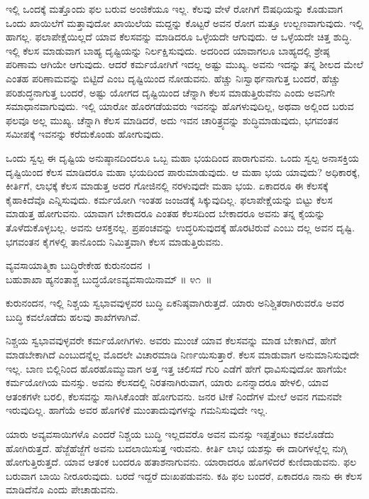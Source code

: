 ಇಲ್ಲಿ ಒಂದಕ್ಕೆ ಮತ್ತೊಂದು ಫಲ ಬರುವ ಅಂಜಿಕೆಯೂ ಇಲ್ಲ. ಕೆಲವು ವೇಳೆ ರೋಗಿಗೆ ಔಷಧಿಯನ್ನು ಕೊಡುವಾಗ ಒಂದು ಖಾಯಿಲೆಗೆ ಮತ್ತಾವುದೋ ಖಾಯಿಲೆಯ ಮದ್ದನ್ನು ಕೊಟ್ಟರೆ ಅವನ ರೋಗ ಮತ್ತೂ ಉಲ್ಬಣವಾಗುವುದು. ಇಲ್ಲಿ ಹಾಗಲ್ಲ. ಫಲಾಪೇಕ್ಷೆಯಿಲ್ಲದೆ ಯಾವ ಕೆಲಸವನ್ನು ಮಾಡಿದರೂ ಒಳ್ಳೆಯದೇ ಆಗುವುದು. ಆ ಒಳ್ಳೆಯದೇ ಚಿತ್ತ ಶುದ್ಧಿ. ಇಲ್ಲಿ ಕೆಲಸ ಮಾಡುವಾಗ ಬಾಹ್ಯ ದೃಷ್ಟಿಯನ್ನು ನಿರ್ಲಕ್ಷಿಸುವುದು. ಅದರಿಂದ ಯಾವಾಗಲೂ ಬಾಹ್ಯದಲ್ಲಿ ಶ್ರೇಷ್ಠ ಪರಿಣಾಮ ಆಗಿಯೇ ಆಗುವುದು. ಆದರೆ ಕರ್ಮಯೋಗಿಗೆ ಇದಲ್ಲ ಅಷ್ಟು ಮುಖ್ಯ. ಅವನು ಇದನ್ನು ತನ್ನ ಶೀಲದ ಮೇಲೆ ಎಂತಹ ಪರಿಣಾಮವನ್ನು ಬಿಟ್ಟಿದೆ ಎಂಬ ದೃಷ್ಟಿಯಿಂದ ನೋಡುವನು. ಹೆಚ್ಚು ನಿಃಸ್ವಾರ್ಥನಾಗುತ್ತ ಬಂದರೆ, ಹೆಚ್ಚು ಪರಿಶುದ್ಧನಾಗುತ್ತ ಬಂದರೆ, ಅಷ್ಟು ಯೋಗದ ದೃಷ್ಟಿಯಿಂದ ಚೆನ್ನಾಗಿ ಕೆಲಸ ಮಾಡುತ್ತಿರುವೆನು ಎಂದು ಅವನಿಗೇ ಸಮಾಧಾನವಾಗುವುದು. ಇಲ್ಲಿ ಯಾರೋ ಹೊರಗಡೆಯವರು ಇವನನ್ನು ಹೊಗಳುವುದಿಲ್ಲ, ಅಥವಾ ಅಲ್ಲಿಂದ ಬರುವ ಫಲವೂ ಅಲ್ಲ ಮುಖ್ಯ. ಚೆನ್ನಾಗಿ ಕೆಲಸ ಮಾಡಿದರೆ, ಅದು ಇವನ ಚಾರಿತ್ರ್ಯವನ್ನು ಶುದ್ಧಿಮಾಡುವುದು, ಭಗವಂತನ ಸಮೀಪಕ್ಕೆ ಇವನನ್ನು ಕರೆದುಕೊಂಡು ಹೋಗುವುದು.

ಒಂದು ಸ್ವಲ್ಪ ಈ ದೃಷ್ಟಿಯ ಅನುಷ್ಠಾನದಿಂದಲೂ ಒಬ್ಬ ಮಹಾ ಭಯದಿಂದ ಪಾರಾಗುವನು. ಒಂದು ಸ್ವಲ್ಪ ಅನಾಸಕ್ತಿಯ ದೃಷ್ಟಿಯಿಂದ ಕೆಲಸ ಮಾಡಿದರೂ ಮಹಾ ಭಯದಿಂದ ಪಾರುಮಾಡುವುದು. ಆ ಮಹಾ ಭಯ ಯಾವುದು? ಅಧಿಕಾರಕ್ಕೆ, ಕೀರ್ತಿಗೆ, ಲಾಭಕ್ಕೆ ಕೆಲಸ ಮಾಡುತ್ತ ಅದರ ಗೋಜಿನಲ್ಲಿ ನರಳುವುದೇ ಮಹಾ ಭಯ. ಏಕಾದರೂ ಈ ಕೆಲಸಕ್ಕೆ ಕೈಹಾಕಿದೆವೊ ಎನ್ನಿಸುವುದು. ಕರ್ಮಯೋಗಿ ಇಂತಹ ಜಂಜಡಕ್ಕೆ ಸಿಕ್ಕುವುದಿಲ್ಲ. ಫಲಾಪೇಕ್ಷೆಯನ್ನು ಬಿಟ್ಟು ಕೆಲಸ ಮಾಡುತ್ತ ಹೋಗುವನು. ಯಾವಾಗ ಬೇಕಾದರೂ ಎಂತಹ ಕೆಲಸದಿಂದ ಬೇಕಾದರೂ ಅವನು ತನ್ನ ಕೈಯನ್ನು ತೊಳೆದುಕೊಳ್ಳಬಲ್ಲ. ಅವನು ಆಸಕ್ತನಲ್ಲ. ಪ್ರಪಂಚವನ್ನು ಉದ್ಧರಿಸುವುದಕ್ಕೆ ಹೊರಟಿರುವೆ ಎಂಬು ದಲ್ಲ ಅವನ ದೃಷ್ಟಿ. ಭಗವಂತನ ಕೈಗಳಲ್ಲಿ ತಾನೊಂದು ನಿಮಿತ್ತವಾಗಿ ಕೆಲಸ ಮಾಡುತ್ತಿರುವನು.

\begin{shloka}
ವ್ಯವಸಾಯಾತ್ಮಿಕಾ ಬುದ್ಧಿರೇಕೇಹ ಕುರುನಂದನ~।\\ಬಹುಶಾಖಾ ಹ್ಯನಂತಾಶ್ಚ ಬುದ್ಧಯೋಽವ್ಯವಸಾಯಿನಾಮ್ \hfill॥ ೪೧~॥
\end{shloka}

\begin{artha}
ಕುರುನಂದನ, ಇಲ್ಲಿ ನಿಶ್ಚಯ ಸ್ವಭಾವವುಳ್ಳವರ ಬುದ್ಧಿ ಏಕನಿಷ್ಠವಾಗಿರುತ್ತದೆ. ಯಾರು ಅನಿಶ್ಚಿತರಾಗಿರುವರೊ ಅವರ ಬುದ್ಧಿ ಕವಲೊಡೆದು ಹಲವು ಶಾಖೆಗಳಾಗಿವೆ.
\end{artha}

ನಿಶ್ಚಯ ಸ್ವಭಾವವುಳ್ಳವರೇ ಕರ್ಮಯೋಗಿಗಳು. ಅವರು ಮುಂಚೆ ಯಾವ ಕೆಲಸವನ್ನು ಮಾಡ ಬೇಕಾಗಿದೆ, ಹೇಗೆ ಮಾಡಬೇಕಾಗಿದೆ ಎಂಬುದನ್ನೆಲ್ಲ ಮೊದಲೇ ವಿಚಾರಮಾಡಿ ನಿರ್ಣಯಿಸುತ್ತಾರೆ. ಕೆಲಸ ಮಾಡುವಾಗ ಅನುಮಾನಿಸುವುದೇ ಇಲ್ಲ. ಬಾಣ ಬಿಲ್ಲಿನಿಂದ ಹೊರಹೊಮ್ಮುವಾಗ ಅತ್ತ ಇತ್ತ ಚಲಿಸದೆ ಗುರಿ ಎಡೆಗೆ ಹೇಗೆ ಧಾವಿಸುವುದೋ ಹಾಗೆಯೇ ಕರ್ಮಯೋಗಿಯ ಮನಸ್ಸು. ಅವನು ಕೆಲಸದಲ್ಲಿ ನಿರತನಾಗಿರುವಾಗ, ಯಾರು ಏನನ್ನಾದರೂ ಹೇಳಲಿ, ಯಾವ ಆತಂಕಗಳೇ ಬರಲಿ, ಕೆಲಸವನ್ನು ಸಾಗಿಸಿಕೊಂಡೇ ಹೋಗುವನು. ಜನರ ಟೀಕೆ ನಿಂದೆಗಳ ಮೇಲೆ ಅವನ ಗಮನವೇ ಇರುವುದಿಲ್ಲ. ಹಾಗೆಯೆ ಅವರ ಹೊಗಳಿಕೆ ಮುಂತಾದುವುಗಳನ್ನು ಗಮನಿಸುವುದೇ ಇಲ್ಲ.

ಯಾರು ಅವ್ಯವಸಾಯಿಗಳೊ ಎಂದರೆ ನಿಶ್ಚಯ ಬುದ್ಧಿ ಇಲ್ಲದವರೊ ಅವನ ಮನಸ್ಸು ಇಪ್ಪತ್ತೆಂಟು ಕವಲೊಡೆದು ಹೋಗಿರುತ್ತದೆ. ಹೆಜ್ಜೆಹೆಜ್ಜೆಗೆ ಅವನು ಬದಲಾಯಿಸುತ್ತ ಇರುವನು. ಕೀರ್ತಿ ಲಾಭ ಯಶಸ್ಸು ಈ ದಾರಿಗಳಲ್ಲೆಲ್ಲ ನುಗ್ಗಿ ಹೋಗುತ್ತಿರುತ್ತದೆ. ಯಾವ ಆತಂಕ ಬಂದರೂ ಹತಾಶನಾಗುವನು. ಯಾರಾದರೂ ಹೊಗಳಿದರೆ ಕುಣಿದಾಡುವನು. ಫಲ ಬರುವಾಗ ಬಾಯಿ ನೀರೂರುವುದು. ಬರದೆ ಇದ್ದರೆ ದುಃಖಪಡುವನು. ಕಹಿ ಫಲ ಬಂದರೆ, ಏಕಾದರೂ ನಾನು ಈ ಕೆಲಸ ಮಾಡಿದೆನೊ ಎಂದು ಪೇಚಾಡುವನು.

